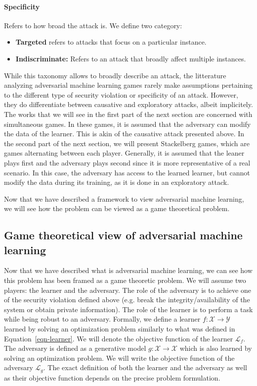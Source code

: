 \paragraph{Specificity} Refers to how broad the attack is. We define two category:
\begin{itemize}
    \item \textbf{Targeted} refers to attacks that focus on a particular instance.
    \item \textbf{Indiscriminate:} Refers to an attack that broadly affect multiple instances.
\end{itemize}

While this taxonomy allows to broadly describe an attack, the litterature analyzing adversarial machine learning games rarely make assumptions pertaining to the different type of security violation or specificity of an attack. However, they do differentiate between causative and exploratory attacks, albeit implicitely. The works that we will see in the first part of the next section are concerned with simultaneous games. In these games, it is assumed that the adversary can modify the data of the learner. This is akin of the causative attack presented above. In the second part of the next section, we will present Stackelberg games, which are games alternating between each player. Generally, it is assumed that the leaner plays first and the adversary plays second since it is more representative of a real scenario. In this case, the adversary has access to the learned learner, but cannot modify the data during its training, as it is done in an exploratory attack.

Now that we have described a framework to view adversarial machine learning, we will see how the problem can be viewed as a game theoretical problem.

\subsection{Game theoretical view of adversarial machine learning}

Now that we have described what is adversarial machine learning, we can see how this problem has been framed as a game theoretic problem. We will assume two players: the learner and the adversary. The role of the adversary is to achieve one of the security violation defined above (e.g. break the integrity/availability of the system or obtain private information). The role of the learner is to perform a task while being robust to an adversary. Formally, we define a learner $f:\mathcal X\to \mathcal Y$ learned by solving an optimization problem similarly to what was defined in Equation~\eqref{eqn-learner}. We will denote the objective function of the learner $\mathcal{L}_f$. The adversary is defined as a generative model $g:\mathcal X\to \mathcal X$ which is also learned by solving an optimization problem. We will write the objective function of the adversary $\mathcal{L}_g$. The exact definition of both the learner and the adversary as well as their objective function depends on the precise problem formulation.

